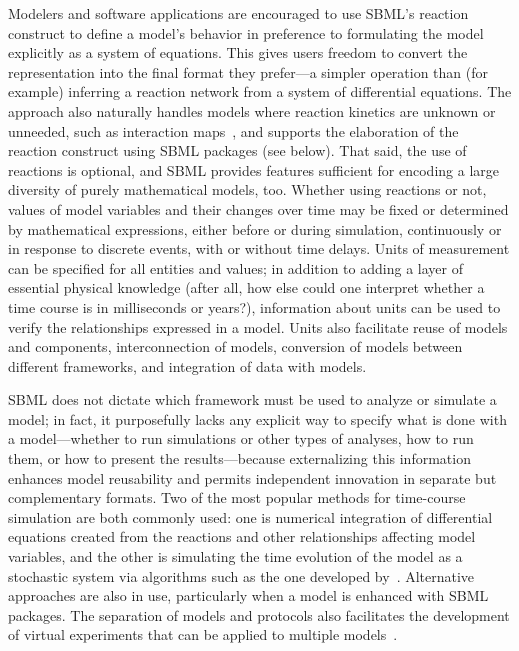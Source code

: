 \documentclass{sbml-paper}
\begin{document}
Modelers and software applications are encouraged to use SBML's reaction construct to define a model's behavior in preference to formulating the model explicitly as a system of equations.  This gives users freedom to convert the representation into the final format they prefer---a simpler operation than (for example) inferring a reaction network from a system of differential equations.  The approach also naturally handles models where reaction kinetics are unknown or unneeded, such as interaction maps~\citep[e.g.,][]{thiele2013community}, and supports the elaboration of the reaction construct using SBML packages (see below).  That said, the use of reactions is optional, and SBML provides features sufficient for encoding a large diversity of purely mathematical models, too.  Whether using reactions or not, values of model variables and their changes over time may be fixed or determined by mathematical expressions, either before or during simulation, continuously or in response to discrete events, with or without time delays.  Units of measurement can be specified for all entities and values; in addition to adding a layer of essential physical knowledge (after all, how else could one interpret whether a time course is in milliseconds or years?), information about units can be used to verify the relationships expressed in a model.  Units also facilitate reuse of models and components, interconnection of models, conversion of models between different frameworks, and integration of data with models.

SBML does not dictate which framework must be used to analyze or simulate a model; in fact, it purposefully lacks any explicit way to specify what is done with a model---whether to run simulations or other types of analyses, how to run them, or how to present the results---because externalizing this information enhances model reusability and permits independent innovation in separate but complementary formats.  Two of the most popular methods for time-course simulation are both commonly used: one is numerical integration of differential equations created from the reactions and other relationships affecting model variables, and the other is simulating the time evolution of the model as a stochastic system via algorithms such as the one developed by~\cite{gillespie1977exact}.  Alternative approaches are also in use, particularly when a model is enhanced with SBML packages.  The separation of models and protocols also facilitates the development of virtual experiments that can be applied to multiple models~\citep{Cooper2015call}.
\end{document}
